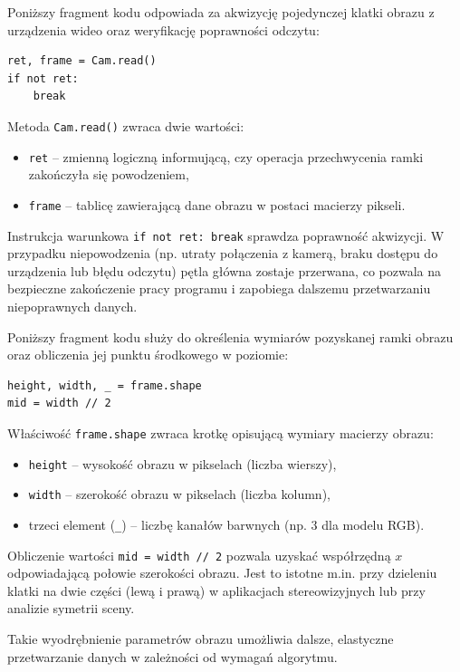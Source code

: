 \documentclass[magisterska]{pracadypl}
\begin{document}
Poniższy fragment kodu odpowiada za akwizycję pojedynczej klatki obrazu z urządzenia 
wideo oraz weryfikację poprawności odczytu:  

\begin{lstlisting}[style=mypython]
ret, frame = Cam.read()
if not ret:
    break
\end{lstlisting}

Metoda \texttt{Cam.read()} zwraca dwie wartości:  
\begin{itemize}
    \item \texttt{ret} – zmienną logiczną informującą, czy operacja przechwycenia ramki zakończyła się powodzeniem,  
    \item \texttt{frame} – tablicę zawierającą dane obrazu w postaci macierzy pikseli.  
\end{itemize}

Instrukcja warunkowa \texttt{if not ret: break} sprawdza poprawność akwizycji. 
W przypadku niepowodzenia (np. utraty połączenia z kamerą, braku dostępu do urządzenia 
lub błędu odczytu) pętla główna zostaje przerwana, co pozwala na bezpieczne zakończenie 
pracy programu i zapobiega dalszemu przetwarzaniu niepoprawnych danych.  
  
Poniższy fragment kodu służy do określenia wymiarów pozyskanej ramki obrazu oraz obliczenia jej punktu środkowego w poziomie:

\begin{lstlisting}[style=mypython]
height, width, _ = frame.shape
mid = width // 2
\end{lstlisting}

Właściwość \texttt{frame.shape} zwraca krotkę opisującą wymiary macierzy obrazu:  
\begin{itemize}
    \item \texttt{height} – wysokość obrazu w pikselach (liczba wierszy),  
    \item \texttt{width} – szerokość obrazu w pikselach (liczba kolumn),  
    \item trzeci element (\texttt{\_}) – liczbę kanałów barwnych (np. 3 dla modelu RGB).  
\end{itemize}

Obliczenie wartości \texttt{mid = width // 2} pozwala uzyskać współrzędną $x$ odpowiadającą połowie szerokości obrazu. Jest to istotne m.in. przy dzieleniu klatki na dwie części (lewą i prawą) w aplikacjach stereowizyjnych lub przy analizie symetrii sceny.  

Takie wyodrębnienie parametrów obrazu umożliwia dalsze, elastyczne przetwarzanie danych w zależności od wymagań algorytmu.  
\end{document}
